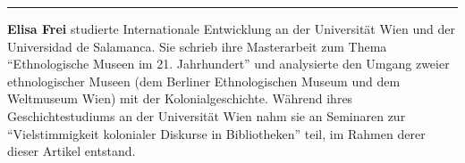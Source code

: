 \begin{center}\rule{0.5\linewidth}{0.5pt}\end{center}

\textbf{Elisa Frei} studierte Internationale Entwicklung an der
Universität Wien und der Universidad de Salamanca. Sie schrieb ihre
Masterarbeit zum Thema ``Ethnologische Museen im 21. Jahrhundert'' und
analysierte den Umgang zweier ethnologischer Museen (dem Berliner
Ethnologischen Museum und dem Weltmuseum Wien) mit der
Kolonialgeschichte. Während ihres Geschichtestudiums an der Universität
Wien nahm sie an Seminaren zur ``Vielstimmigkeit kolonialer Diskurse in
Bibliotheken'' teil, im Rahmen derer dieser Artikel entstand.
